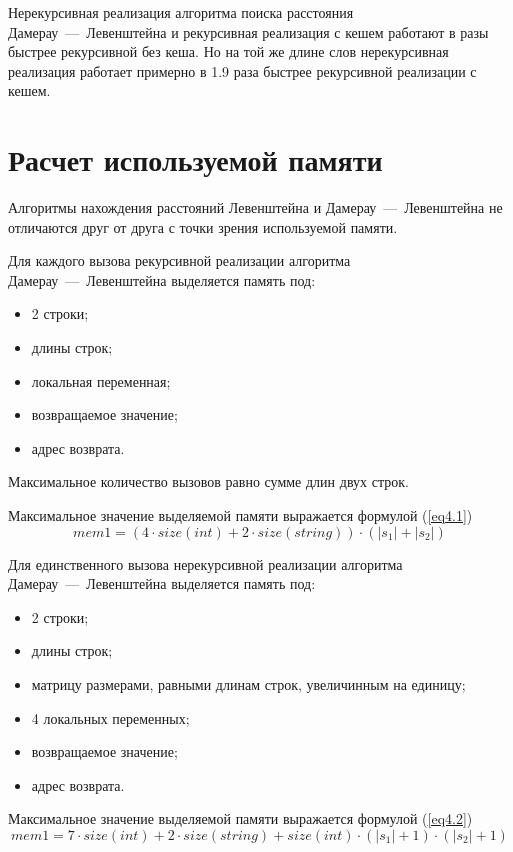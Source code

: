 Нерекурсивная реализация алгоритма поиска расстояния Дамерау~---~Левенштейна и рекурсивная реализация с кешем работают в разы быстрее рекурсивной без кеша. Но на той же длине слов нерекурсивная реализация работает примерно в 1.9 раза быстрее рекурсивной реализации с кешем.

\section{Расчет используемой памяти}

Алгоритмы нахождения расстояний Левенштейна и Дамерау~---~Левенштейна не отличаются друг от друга с точки зрения используемой памяти.

Для каждого вызова рекурсивной реализации алгоритма Дамерау~---~Левенштейна выделяется память под:
\begin{itemize}[left=\parindent]
	\item 2 строки;
	\item длины строк;
	\item локальная переменная;
	\item возвращаемое значение;
	\item адрес возврата.
\end{itemize}

Максимальное количество вызовов равно сумме длин двух строк.

Максимальное значение выделяемой памяти выражается формулой (\ref{eq4.1})
\begin{equation}\label{eq4.1}
	mem1 = (4 \cdot size(int) + 2 \cdot size(string)) \cdot (|s_1| + |s_2|)
\end{equation}

Для единственного вызова нерекурсивной реализации алгоритма Дамерау~---~Левенштейна выделяется память под:
\begin{itemize}[left=\parindent]
	\item 2 строки;
	\item длины строк;
	\item матрицу размерами, равными длинам строк, увеличинным на единицу;
	\item 4 локальных переменных;
	\item возвращаемое значение;
	\item адрес возврата.
\end{itemize}

Максимальное значение выделяемой памяти выражается формулой (\ref{eq4.2})
\begin{equation}\label{eq4.2}
	mem1 = 7 \cdot size(int) + 2 \cdot size(string) + size(int ) \cdot (|s_1| + 1) \cdot (|s_2| + 1)
\end{equation}

